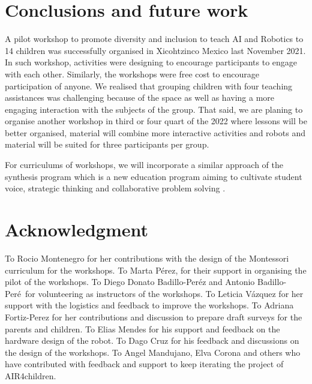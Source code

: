 \documentclass[conference]{IEEEtran}
\begin{document}
\section{Conclusions and future work}
A pilot workshop to promote diversity and inclusion to teach AI and Robotics to 14 children was successfully organised in Xicohtzinco Mexico last November 2021.
In such workshop, activities were designing to encourage participants to engage with each other. 
Similarly, the workshops were free cost to encourage participation of anyone. 
We realised that grouping children with four teaching assistances was challenging because of the space as well as having a more engaging interaction with the subjects of the group. 
That said, we are planing to organise another workshop in third or four quart of the 2022 where lessons will be better organised, material will combine more interactive activities and robots and material will be suited for three participants per group. 

For curriculums of workshops, we will incorporate a similar approach of the synthesis program which is a new education program aiming to cultivate student voice, strategic thinking and collaborative problem solving \cite{synthesis2022}.


\section*{Acknowledgment}
To Rocio Montenegro for her contributions with the design of the Montessori curriculum for the workshops.
To Marta P\'erez, for their support in organising the pilot of the workshops.
To Diego Donato Badillo-Per\'ez and Antonio Badillo-Per\'e\ for volunteering as instructors of the workshops.
To Leticia V\'azquez for her support with the logistics and feedback to improve the workshops.
To Adriana Fortiz-Perez for her contributions and discussion to prepare draft surveys for the parents and children. 
To Elias Mendes for his support and feedback on the hardware design of the robot.
To Dago Cruz for his feedback and discussions on the design of the workshops.
To Angel Mandujano, Elva Corona and others who have contributed with feedback and support to keep iterating the project of AIR4children. 



\end{document}
